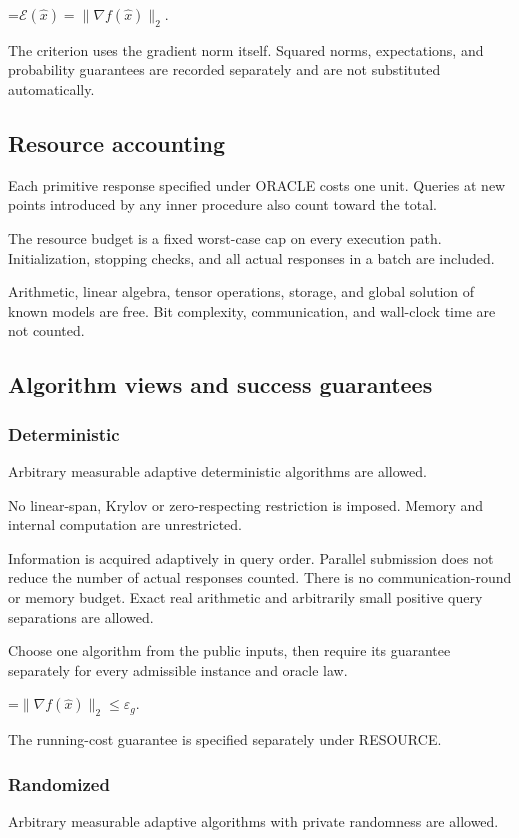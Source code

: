 \documentclass[10pt,a4paper]{article}
\newcommand{\AtlasMath}[1]{\par\begingroup\centering\setbox0=\hbox{$\displaystyle #1$}\ifdim\wd0>1.4\linewidth\typeout{ATLAS WIDE FORMULA: \the\wd0}\fi\ifdim\wd0>\linewidth\resizebox{\linewidth}{!}{\box0}\else\box0\fi\par\endgroup}
\begin{document}
\AtlasMath{\mathcal{E}(\widehat{x})=\|\nabla f(\widehat{x})\|_2.}


The criterion uses the gradient norm itself. Squared norms, expectations, and probability guarantees are recorded separately and are not substituted automatically.

\subsection{Resource accounting}
Each primitive response specified under ORACLE costs one unit. Queries at new points introduced by any inner procedure also count toward the total.

The resource budget is a fixed worst-case cap on every execution path. Initialization, stopping checks, and all actual responses in a batch are included.

Arithmetic, linear algebra, tensor operations, storage, and global solution of known models are free. Bit complexity, communication, and wall-clock time are not counted.

\subsection{Algorithm views and success guarantees}
\subsubsection{Deterministic}
Arbitrary measurable adaptive deterministic algorithms are allowed.

No linear-span, Krylov or zero-respecting restriction is imposed. Memory and internal computation are unrestricted.

Information is acquired adaptively in query order. Parallel submission does not reduce the number of actual responses counted. There is no communication-round or memory budget. Exact real arithmetic and arbitrarily small positive query separations are allowed.

Choose one algorithm from the public inputs, then require its guarantee separately for every admissible instance and oracle law.


\AtlasMath{\|\nabla f(\widehat{x})\|_2\le \varepsilon_g.}


The running-cost guarantee is specified separately under RESOURCE.

\subsubsection{Randomized}
Arbitrary measurable adaptive algorithms with private randomness are allowed.
\end{document}
